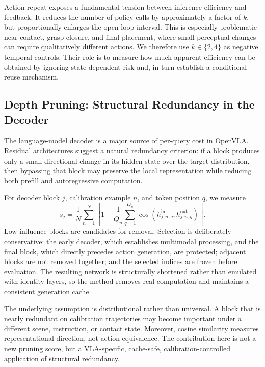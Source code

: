 Action repeat exposes a fundamental tension between inference efficiency and
feedback. It reduces the number of policy calls by approximately a factor of
$k$, but proportionally enlarges the open-loop interval. This is especially
problematic near contact, grasp closure, and final placement, where small
perceptual changes can require qualitatively different actions. We therefore
use $k\in\{2,4\}$ as negative temporal controls. Their role is to measure how
much apparent efficiency can be obtained by ignoring state-dependent risk and,
in turn establish a conditional reuse mechanism.

\subsection{Depth Pruning: Structural Redundancy in the Decoder}
\label{sec:method_depth_pruning}

The language-model decoder is a major source of per-query cost in OpenVLA.
Residual architectures suggest a natural redundancy criterion: if a block
produces only a small directional change in its hidden state over the target
distribution, then bypassing that block may preserve the local representation
while reducing both prefill and autoregressive computation.

For decoder block $j$, calibration example $n$, and token position $q$, we
measure
\begin{equation}
    s_j=\frac{1}{N}\sum_{n=1}^{N}
        \left[1-\frac{1}{Q_n}\sum_{q=1}^{Q_n}
        \cos\!\left(h^{\mathrm{in}}_{j,n,q},
                    h^{\mathrm{out}}_{j,n,q}\right)\right].
    \label{eq:block_influence}
\end{equation}
Low-influence blocks are candidates for removal. Selection is deliberately
conservative: the early decoder, which establishes multimodal processing, and
the final block, which directly precedes action generation, are protected;
adjacent blocks are not removed together; and the selected indices are frozen
before evaluation. The resulting network is structurally shortened rather
than emulated with identity layers, so the method removes real computation and
maintains a consistent generation cache.

The underlying assumption is distributional rather than universal. A block
that is nearly redundant on calibration trajectories may become important
under a different scene, instruction, or contact state. Moreover, cosine
similarity measures representational direction, not action equivalence.
The contribution here is
not a new pruning score, but a VLA-specific, cache-safe, calibration-controlled
application of structural redundancy.

